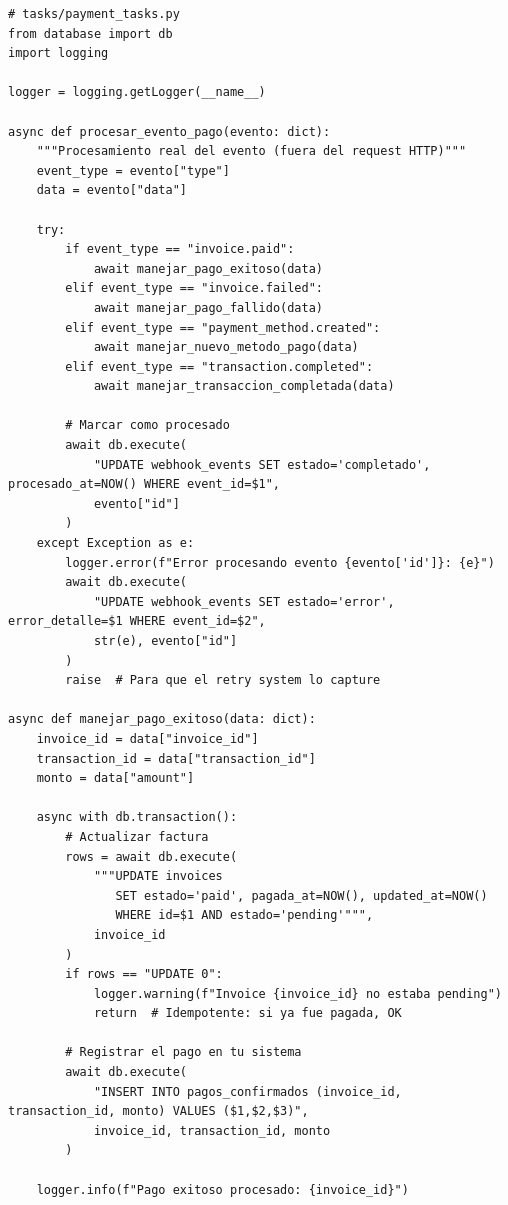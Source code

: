 \documentclass[11pt,a4paper]{article}
\begin{document}
\begin{lstlisting}[style=python]
# tasks/payment_tasks.py
from database import db
import logging

logger = logging.getLogger(__name__)

async def procesar_evento_pago(evento: dict):
    """Procesamiento real del evento (fuera del request HTTP)"""
    event_type = evento["type"]
    data = evento["data"]

    try:
        if event_type == "invoice.paid":
            await manejar_pago_exitoso(data)
        elif event_type == "invoice.failed":
            await manejar_pago_fallido(data)
        elif event_type == "payment_method.created":
            await manejar_nuevo_metodo_pago(data)
        elif event_type == "transaction.completed":
            await manejar_transaccion_completada(data)

        # Marcar como procesado
        await db.execute(
            "UPDATE webhook_events SET estado='completado', procesado_at=NOW() WHERE event_id=$1",
            evento["id"]
        )
    except Exception as e:
        logger.error(f"Error procesando evento {evento['id']}: {e}")
        await db.execute(
            "UPDATE webhook_events SET estado='error', error_detalle=$1 WHERE event_id=$2",
            str(e), evento["id"]
        )
        raise  # Para que el retry system lo capture

async def manejar_pago_exitoso(data: dict):
    invoice_id = data["invoice_id"]
    transaction_id = data["transaction_id"]
    monto = data["amount"]

    async with db.transaction():
        # Actualizar factura
        rows = await db.execute(
            """UPDATE invoices
               SET estado='paid', pagada_at=NOW(), updated_at=NOW()
               WHERE id=$1 AND estado='pending'""",
            invoice_id
        )
        if rows == "UPDATE 0":
            logger.warning(f"Invoice {invoice_id} no estaba pending")
            return  # Idempotente: si ya fue pagada, OK

        # Registrar el pago en tu sistema
        await db.execute(
            "INSERT INTO pagos_confirmados (invoice_id, transaction_id, monto) VALUES ($1,$2,$3)",
            invoice_id, transaction_id, monto
        )

    logger.info(f"Pago exitoso procesado: {invoice_id}")
\end{lstlisting}

\end{document}
